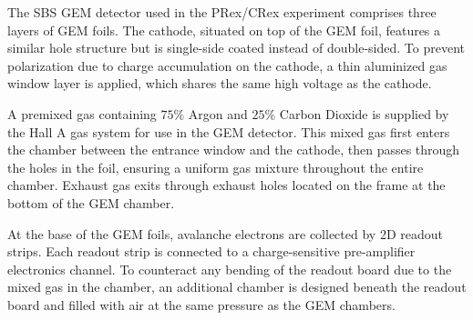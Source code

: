 The SBS GEM detector used in the PRex/CRex experiment comprises three layers of GEM foils. The cathode, situated on top of the GEM foil, features a similar hole structure but is single-side coated instead of double-sided. To prevent polarization due to charge accumulation on the cathode, a thin aluminized gas window layer is applied, which shares the same high voltage as the cathode.

A premixed gas containing $75\%$ Argon and $25\%$ Carbon Dioxide is supplied by the Hall A gas system for use in the GEM detector. This mixed gas first enters the chamber between the entrance window and the cathode, then passes through the holes in the foil, ensuring a uniform gas mixture throughout the entire chamber. Exhaust gas exits through exhaust holes located on the frame at the bottom of the GEM chamber.

At the base of the GEM foils, avalanche electrons are collected by 2D readout strips. Each readout strip is connected to a charge-sensitive pre-amplifier electronics channel. To counteract any bending of the readout board due to the mixed gas in the chamber, an additional chamber is designed beneath the readout board and filled with air at the same pressure as the GEM chambers.


